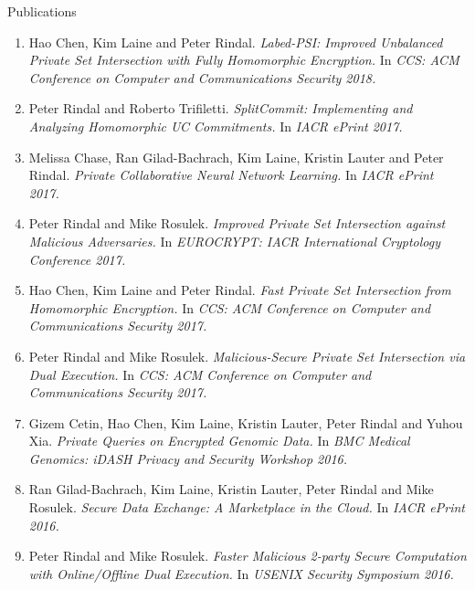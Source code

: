 \documentclass{resume} %
\begin{document}
\begin{rSection}{Publications}
\begin{enumerate}[label=C\arabic* --]
	\item Hao Chen, Kim Laine and Peter Rindal. \emph{Labed-PSI: Improved Unbalanced Private Set Intersection with Fully Homomorphic Encryption.} In \emph{CCS: ACM Conference on Computer and Communications Security 2018.}
	
	\item Peter Rindal and Roberto Trifiletti. \emph{SplitCommit: Implementing and Analyzing Homomorphic UC Commitments.} In \emph{IACR ePrint 2017.}
	
	\item Melissa Chase, Ran Gilad-Bachrach, Kim Laine, Kristin Lauter and Peter Rindal. \emph{Private Collaborative Neural Network Learning.} In \emph{IACR ePrint 2017.}
	
	\item Peter Rindal and Mike Rosulek. \emph{Improved Private Set Intersection against Malicious Adversaries.} In \emph{EUROCRYPT: IACR International Cryptology Conference 2017.}
	
	\item Hao Chen, Kim Laine and Peter Rindal. \emph{Fast Private Set Intersection from Homomorphic Encryption.} In \emph{CCS: ACM Conference on Computer and Communications Security 2017.}
	
	\item Peter Rindal and Mike Rosulek. \emph{Malicious-Secure Private Set Intersection via Dual Execution.} In \emph{CCS: ACM Conference on Computer and Communications Security 2017.}
	
	
	\item Gizem Cetin, Hao Chen, Kim Laine, Kristin Lauter, Peter Rindal and Yuhou Xia. \emph{Private Queries on Encrypted Genomic Data.} In \emph{BMC Medical Genomics:  iDASH Privacy and Security Workshop 2016.}
	
	\item Ran Gilad-Bachrach, Kim Laine, Kristin Lauter, Peter Rindal and Mike Rosulek. \emph{Secure Data Exchange: A Marketplace in the Cloud.} In \emph{IACR ePrint 2016.}
	
	\item Peter Rindal and Mike Rosulek. \emph{Faster Malicious 2-party Secure Computation with Online/Offline Dual Execution.} In \emph{USENIX Security Symposium 2016.}
\end{enumerate}

\end{rSection}



\end{document}
